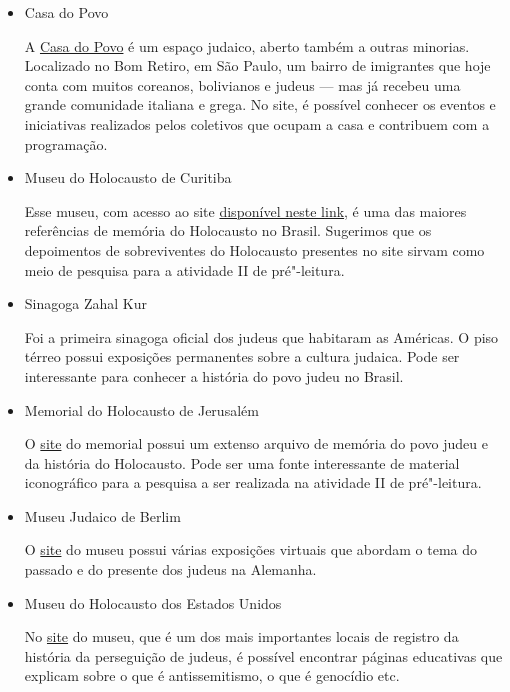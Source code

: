 \documentclass[12pt]{extarticle}
\begin{document}
\begin{itemize}
\item Casa do Povo

A \href{https://casadopovo.org.br/}{Casa do Povo} é um espaço 
judaico, aberto também a outras minorias. Localizado no
Bom Retiro, em São Paulo, um bairro de imigrantes que hoje conta com muitos coreanos, 
bolivianos e judeus --- mas já recebeu uma grande comunidade italiana e grega. 
No site, é possível conhecer
os eventos e iniciativas realizados pelos coletivos que ocupam a casa e 
contribuem com a programação.

\item Museu do Holocausto de Curitiba

Esse museu, com acesso ao site 
\href{https://www.museudoholocausto.org.br/}{disponível neste link}, 
é uma das maiores referências de memória do Holocausto no Brasil.
Sugerimos que os depoimentos de sobreviventes do Holocausto presentes no site
sirvam como meio de pesquisa para a atividade II de pré"-leitura.

\item Sinagoga Zahal Kur

Foi a primeira sinagoga oficial dos judeus que habitaram as Américas. 
O piso térreo possui exposições permanentes sobre a cultura judaica. 
Pode ser interessante para conhecer a história do povo judeu no Brasil.

\item Memorial do Holocausto de Jerusalém

O \href{https://www.yadvashem.org/}{site} do memorial possui um 
extenso arquivo de memória do povo judeu
e da história do Holocausto. Pode ser uma fonte interessante de material 
iconográfico para a pesquisa a ser realizada na
atividade II de pré"-leitura.

\item Museu Judaico de Berlim

O \href{https://www.jmberlin.de/en}{site} do museu possui 
várias exposições virtuais que abordam o tema
do passado e do presente dos judeus na Alemanha.

\item Museu do Holocausto dos Estados Unidos

No \href{https://www.ushmm.org/}{site} do museu, que é um dos 
mais importantes locais de registro da história
da perseguição de judeus, é possível encontrar páginas educativas
que explicam sobre o que é antissemitismo, o que é genocídio etc.
\end{itemize}
\end{document}
